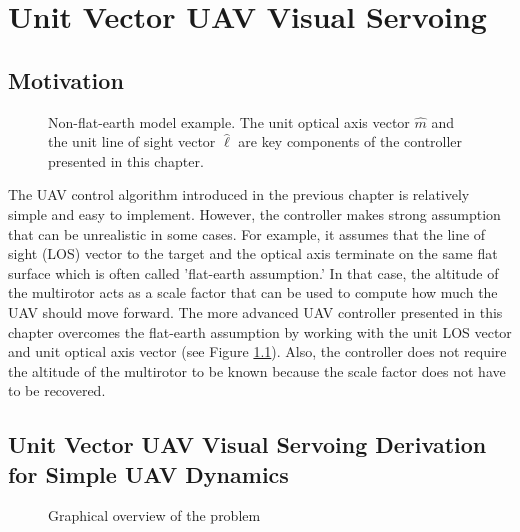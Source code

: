\chapter{Unit Vector UAV Visual Servoing}
\label{chapter4}
\section{Motivation}
\begin{figure}[htbp]
	\centering
	\caption{Non-flat-earth model example. The unit optical axis vector $\hat{m}$ and the unit line of sight vector $\hat{\ell}$ are key components of the controller presented in this chapter.}
	\label{nonflatearth}
\end{figure}
The UAV control algorithm introduced in the previous chapter is relatively simple and easy to implement. However, the controller makes strong assumption that can be unrealistic in some cases. For example, it assumes that the line of sight (LOS) vector to the target and the optical axis terminate on the same flat surface which is often called 'flat-earth assumption.' In that case, the altitude of the multirotor acts as a scale factor that can be used to compute how much the UAV should move forward. The more advanced UAV controller presented in this chapter overcomes the flat-earth assumption by working with the unit LOS vector and unit optical axis vector (see Figure \ref{nonflatearth}). Also, the controller does not require the altitude of the multirotor to be known because the scale factor does not have to be recovered.

\section{Unit Vector UAV Visual Servoing Derivation for Simple UAV Dynamics}
\begin{figure}[htbp]
	\centering
	\caption{Graphical overview of the problem}
	\label{overview}
\end{figure}

